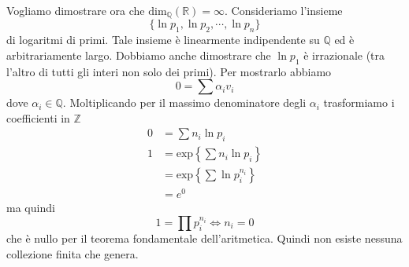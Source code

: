 \documentclass[a4paper]{article}
\begin{document}
Vogliamo dimostrare ora che \(\text{dim}_{\mathbb{Q}}(\mathbb{R}) = \infty\).
Consideriamo l'insieme
\[
    \{
        \ln p_1, \ln p_2, \cdots, \ln p_n    
    \}
\]
di logaritmi di primi. Tale insieme è linearmente indipendente su \(\mathbb{Q}\)
ed è arbitrariamente largo.
Dobbiamo anche dimostrare che \(\ln p_1\) è irrazionale (tra l'altro di tutti gli interi non solo dei primi).
Per mostrarlo abbiamo
\[
    0 = \sum \alpha_i v_i
\]
dove \(\alpha_i \in \mathbb{Q}\).
Moltiplicando per il massimo denominatore degli \(\alpha_i\)
trasformiamo i coefficienti in \(\mathbb{Z}\)
\begin{align*}
    0 &= \sum n_i \ln p_i \\
    1 &= \text{exp}\left\{
        \sum n_i \ln p_i
    \right\} \\
    &= \text{exp}\left\{
        \sum \ln p_i^{n_i}
    \right\} \\
    &= e^0
\end{align*}
ma quindi
\[
    1 = \prod p_i^{n_i} \iff n_i = 0
\]
che è nullo per il teorema fondamentale dell'aritmetica.
Quindi non esiste nessuna collezione finita che genera.
\end{document}
